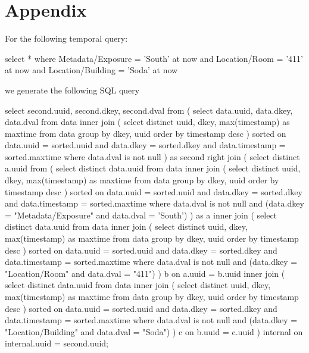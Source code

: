 \section*{Appendix}

For the following temporal query:

\begin{sqlcode}
select * where Metadata/Exposure = 'South' at now
and Location/Room = '411' at now
and Location/Building = 'Soda' at now
\end{sqlcode}

we generate the following SQL query

\onecolumn
\begin{sqlcode}
select second.uuid, second.dkey, second.dval
from (
   select data.uuid, data.dkey, data.dval
   from data
   inner join
   (
        select distinct uuid, dkey, max(timestamp) as maxtime from data
        group by dkey, uuid order by timestamp desc
   ) sorted
   on data.uuid = sorted.uuid and data.dkey = sorted.dkey and data.timestamp = sorted.maxtime
   where data.dval is not null
) as second
right join
(
    select distinct a.uuid from
    (
        select distinct data.uuid
        from data
        inner join
        (
            select distinct uuid, dkey, max(timestamp) as maxtime from data
            group by dkey, uuid order by timestamp desc
        ) sorted
        on data.uuid = sorted.uuid and data.dkey = sorted.dkey and data.timestamp = sorted.maxtime
        where data.dval is not null
            and (data.dkey = "Metadata/Exposure" and data.dval = 'South')
    ) as a
    inner join
    (
        select distinct data.uuid
        from data
        inner join
        (
            select distinct uuid, dkey, max(timestamp) as maxtime from data
            group by dkey, uuid order by timestamp desc
        ) sorted
        on data.uuid = sorted.uuid and data.dkey = sorted.dkey and data.timestamp = sorted.maxtime
        where data.dval is not null
            and (data.dkey = "Location/Room" and data.dval = "411")
    ) b
    on a.uuid = b.uuid
    inner join
    (
        select distinct data.uuid
        from data
        inner join
        (
            select distinct uuid, dkey, max(timestamp) as maxtime from data
            group by dkey, uuid order by timestamp desc
        ) sorted
        on data.uuid = sorted.uuid and data.dkey = sorted.dkey and data.timestamp = sorted.maxtime
        where data.dval is not null
            and (data.dkey = "Location/Building" and data.dval = "Soda")
    ) c
    on b.uuid = c.uuid
) internal
on internal.uuid = second.uuid;
\end{sqlcode}
\twocolumn
